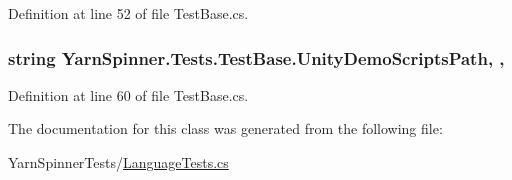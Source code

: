 Definition at line 52 of file Test\-Base.\-cs.

\hypertarget{a00160_a39922286f6255e4fd0e433a4fc7521c4}{
\subsubsection[{Unity\-Demo\-Scripts\-Path}]{\setlength{\rightskip}{0pt plus 5cm}string Yarn\-Spinner.\-Tests.\-Test\-Base.\-Unity\-Demo\-Scripts\-Path\hspace{0.3cm}{\ttfamily [static]}, {\ttfamily [get]}, {\ttfamily [inherited]}}}\label{a00160_a39922286f6255e4fd0e433a4fc7521c4}


Definition at line 60 of file Test\-Base.\-cs.



The documentation for this class was generated from the following file\-:\begin{DoxyCompactItemize}
\item 
Yarn\-Spinner\-Tests/\hyperlink{a00311}{Language\-Tests.\-cs}\end{DoxyCompactItemize}
